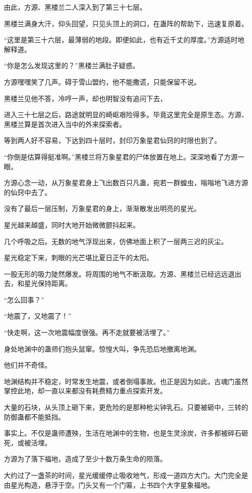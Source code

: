 \begin{this_body}
由此，方源、黑楼兰二人深入到了第三十七层。

黑楼兰满身大汗，仰头回望，只见头顶上的洞口，在蛊阵的帮助下，迅速复原着。

“这里是第三十六层，最薄弱的地段。即便如此，也有近千丈的厚度。”方源适时地解释道。

“你是怎么发现这里的？”黑楼兰满肚子疑惑。

方源嘿嘿笑了几声。碍于雪山盟约，他不能撒谎，只能保留不说。

黑楼兰见他不答，冷哼一声，却也明智没有追问下去，

进入三十七层之后，路途就明显的崎岖艰险得多。毕竟这里完全是原生态。方源、黑楼兰算是首次进入当中的外来探索者。

等到两人好不容易，下达到四十层时，封印万象星君仙窍的时限也到了。

“你倒是估算得挺准啊。”黑楼兰将万象星君的尸体放置在地上。深深地看了方源一眼。

方源心念一动，从万象星君身上飞出数百只凡蛊，宛若一群蝗虫，嗡嗡地飞进方源的仙窍中去了。

没有了最后一层压制，万象星君的身上，渐渐散发出明亮的星光。

星光越来越盛，同时大地开始微微颤抖起来。

几个呼吸之后。无数的地气浮现出来，仿佛地面上积了一层两三迟的灰尘。

星光稳定下来，刺眼的光芒堪比夏日正午的太阳。

一股无形的吸力陡然爆发。将周围的地气不断汲取。方源、黑楼兰已经远远退出去，和星光保持距离。

“怎么回事？”

“地震了，又地震了！”

“快走啊，这一次地震幅度很强。再不走就要被活埋了。”

身处地渊中的蛊师们抱头鼠窜。惊惶大叫，争先恐后地撤离地渊。

他们并不奇怪。

地渊结构并不稳定，时常发生地震，或者倒塌事故。也正是因为如此，古魂门虽然掌控此地，却一直以来都没有耗费精力重点探索开发。

大量的石块，从头顶上砸下来，更危险的是那种枪尖钟乳石。只要被砸中，三转的防御蛊都不能抵挡。

事实上。不仅是蛊师遭殃，生活在地渊中的生物，也是生灵涂炭，许多都被碎石砸死，或被活埋。

方源为了落下福地，造成了至少十数万条生命的陨落。

大约过了一盏茶的时间，星光缓缓停止吸收地气，形成一道四方大门。大门完全是由星光构造，悬浮于空。门头又有一个门匾，上书四个大字星象福地。


\end{this_body}
